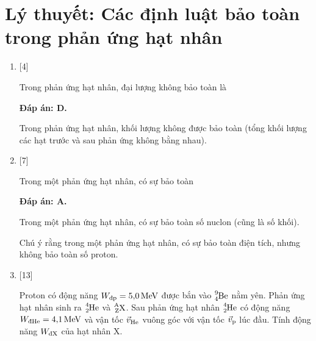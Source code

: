\section{Lý thuyết: Các định luật bảo toàn trong phản ứng hạt nhân}
\begin{enumerate}[label=\bfseries Câu \arabic*:]
	\item {} [4]
	
	\cauhoi
	{Trong phản ứng hạt nhân, đại lượng không bảo toàn là
	}
	
	\loigiai
	{		\textbf{Đáp án: D.}
		
		Trong phản ứng hạt nhân, khối lượng không được bảo toàn (tổng khối lượng các hạt trước và sau phản ứng không bằng nhau).
		
	}
	\item {} [7]
	
	\cauhoi
	{Trong một phản ứng hạt nhân, có sự bảo toàn
	}
	
	\loigiai
	{		\textbf{Đáp án: A.}
		
		Trong một phản ứng hạt nhân, có sự bảo toàn số nuclon (cũng là số khối).
		
		Chú ý rằng trong một phản ứng hạt nhân, có sự bảo toàn điện tích, nhưng không bảo toàn số proton.
		
	}
	\item {} [13]
	
	\cauhoi
	{Proton có động năng $W_{\text{đ} \ce{p}} = \SI{5.0}{MeV}$ được bắn vào $\ce{^9_4 Be}$ nằm yên. Phản ứng hạt nhân sinh ra $\ce{^4_2 He}$ và $\ce{^A_Z X}$. Sau phản ứng hạt nhân $\ce{^4_2 He}$ có động năng $W_{\text{đ} \ce{He}} = \SI{4.1}{MeV}$ và vận tốc $\vec v_{\ce{He}}$ vuông góc với vận tốc $\vec v_{\ce{p}}$ lúc đầu. Tính động năng $W_{\text{đ} \ce{X}}$ của hạt nhân X.
	}
	

\end{enumerate}
